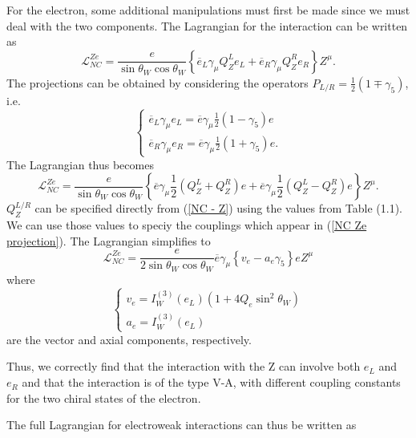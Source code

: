 \documentclass[10pt,a4paper]{book}
\begin{document}
For the electron, some additional manipulations must first be made since we must deal with the two components. The Lagrangian for the interaction can be written as
\begin{equation}
\mathcal{L}_{NC}^{Ze} = \frac{e}{\sin\theta_W\cos\theta_W}\left\lbrace \overline{e}_L \gamma_\mu Q_Z^L e_L + \overline{e}_R \gamma_\mu Q_Z^R e_R  \right\rbrace Z^\mu.
\end{equation}
The projections can be obtained by considering the operators $P_{L/R} = \frac{1}{2}\left(1 \mp \gamma_5\right)$, i.e.
\begin{equation}
\begin{cases}
\overline{e}_L \gamma_\mu e_L = \overline{e} \gamma_\mu \frac{1}{2}\left(1-\gamma_5\right)e \\
\overline{e}_R \gamma_\mu e_R = \overline{e} \gamma_\mu \frac{1}{2}\left(1+\gamma_5\right)e .
\end{cases}
\end{equation}
The Lagrangian thus becomes
\begin{equation}
\label{NC Ze projection}
\mathcal{L}_{NC}^{Ze} = \frac{e}{\sin\theta_W\cos\theta_W}\left\lbrace \overline{e}\gamma_\mu\frac{1}{2}(Q^L_Z + Q^R_Z)e + \overline{e}\gamma_\mu\frac{1}{2}(Q^L_Z - Q^R_Z)e  \right\rbrace Z^\mu.
\end{equation}
$Q_Z^{L/R}$ can be specified directly from (\ref{NC - Z}) using the values from Table (1.1). We can use those values to speciy the couplings which appear in (\ref{NC Ze projection}). The Lagrangian simplifies to
\begin{equation}
\mathcal{L}^{Ze}_{NC} = \frac{e}{2\sin\theta_W\cos\theta_W} \overline{e}\gamma_\mu \left\lbrace v_e - a_e \gamma_5\right\rbrace e Z^\mu
\end{equation} 
where
\begin{equation}
\begin{cases}
v_e = I^{(3)}_W (e_L) \left( 1 + 4Q_e\sin^2\theta_W \right) \\
a_e = I^{(3)}_W (e_L)
\end{cases}
\end{equation}
are the vector and axial components, respectively. 

Thus, we correctly find that the interaction with the Z can involve both $e_L$ and $e_R$ and that the interaction is of the type V-A, with different coupling constants for the two chiral states of the electron. 

The full Lagrangian for electroweak interactions can thus be written as
\end{document}
